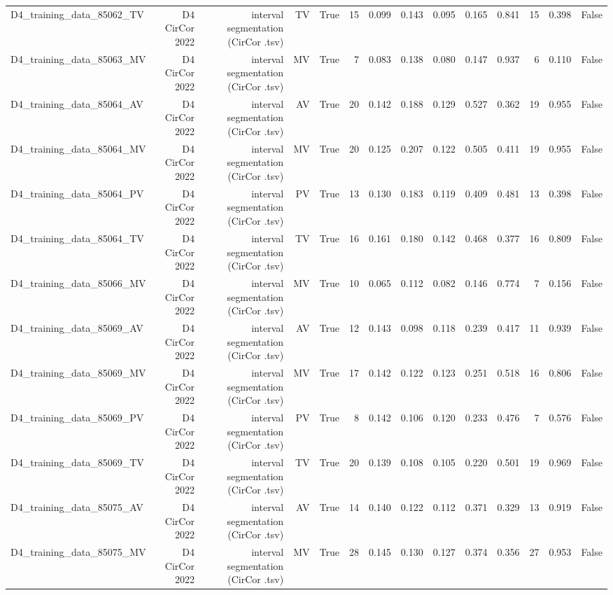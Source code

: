 \begin{table}[htbp]
\begin{tabular}{lrrrrrrrrrrrrr}
    D4\_training\_data\_85062\_TV & D4 CirCor 2022 & interval segmentation (CirCor .tsv) & TV & True & 15 & 0.099 & 0.143 & 0.095 & 0.165 & 0.841 & 15 & 0.398 & False \\
    D4\_training\_data\_85063\_MV & D4 CirCor 2022 & interval segmentation (CirCor .tsv) & MV & True & 7 & 0.083 & 0.138 & 0.080 & 0.147 & 0.937 & 6 & 0.110 & False \\
    D4\_training\_data\_85064\_AV & D4 CirCor 2022 & interval segmentation (CirCor .tsv) & AV & True & 20 & 0.142 & 0.188 & 0.129 & 0.527 & 0.362 & 19 & 0.955 & False \\
    D4\_training\_data\_85064\_MV & D4 CirCor 2022 & interval segmentation (CirCor .tsv) & MV & True & 20 & 0.125 & 0.207 & 0.122 & 0.505 & 0.411 & 19 & 0.955 & False \\
    D4\_training\_data\_85064\_PV & D4 CirCor 2022 & interval segmentation (CirCor .tsv) & PV & True & 13 & 0.130 & 0.183 & 0.119 & 0.409 & 0.481 & 13 & 0.398 & False \\
    D4\_training\_data\_85064\_TV & D4 CirCor 2022 & interval segmentation (CirCor .tsv) & TV & True & 16 & 0.161 & 0.180 & 0.142 & 0.468 & 0.377 & 16 & 0.809 & False \\
    D4\_training\_data\_85066\_MV & D4 CirCor 2022 & interval segmentation (CirCor .tsv) & MV & True & 10 & 0.065 & 0.112 & 0.082 & 0.146 & 0.774 & 7 & 0.156 & False \\
    D4\_training\_data\_85069\_AV & D4 CirCor 2022 & interval segmentation (CirCor .tsv) & AV & True & 12 & 0.143 & 0.098 & 0.118 & 0.239 & 0.417 & 11 & 0.939 & False \\
    D4\_training\_data\_85069\_MV & D4 CirCor 2022 & interval segmentation (CirCor .tsv) & MV & True & 17 & 0.142 & 0.122 & 0.123 & 0.251 & 0.518 & 16 & 0.806 & False \\
    D4\_training\_data\_85069\_PV & D4 CirCor 2022 & interval segmentation (CirCor .tsv) & PV & True & 8 & 0.142 & 0.106 & 0.120 & 0.233 & 0.476 & 7 & 0.576 & False \\
    D4\_training\_data\_85069\_TV & D4 CirCor 2022 & interval segmentation (CirCor .tsv) & TV & True & 20 & 0.139 & 0.108 & 0.105 & 0.220 & 0.501 & 19 & 0.969 & False \\
    D4\_training\_data\_85075\_AV & D4 CirCor 2022 & interval segmentation (CirCor .tsv) & AV & True & 14 & 0.140 & 0.122 & 0.112 & 0.371 & 0.329 & 13 & 0.919 & False \\
    D4\_training\_data\_85075\_MV & D4 CirCor 2022 & interval segmentation (CirCor .tsv) & MV & True & 28 & 0.145 & 0.130 & 0.127 & 0.374 & 0.356 & 27 & 0.953 & False \\

\end{tabular}
\end{table}
